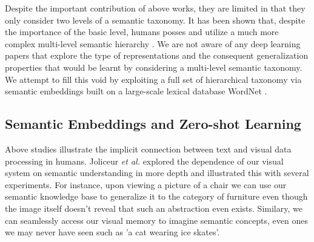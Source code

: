 \documentclass[12pt]{report}
\begin{document}
Despite the important contribution of above works, they are limited in that they only consider two levels of a semantic taxonomy. It has been shown that, despite the importance of the basic level, humans posses and utilize a much more complex multi-level semantic hierarchy \cite{Joliceur1984}. We are not aware of any deep learning papers that explore the type of representations and the consequent generalization properties that would be learnt by considering a multi-level semantic taxonomy. We attempt to fill this void by exploiting a full set of hierarchical taxonomy via semantic embeddings built on a large-scale lexical database WordNet \cite{Miller1995}.

\subsection{Semantic Embeddings and Zero-shot Learning}
Above studies illustrate the implicit connection between text and visual data processing in humans. Joliceur \textit{et al.} \cite{Joliceur1984} explored the dependence of our visual system on semantic understanding in more depth and illustrated this with several experiments. For instance, upon viewing a picture of a chair we can use our semantic knowledge base to generalize it to the category of furniture even though the image itself doesn't reveal that such an abstraction even exists. Similary, we can seamlessly access our visual memory to imagine semantic concepts, even ones we may never have seen such as 'a cat wearing ice skates'.
\end{document}

